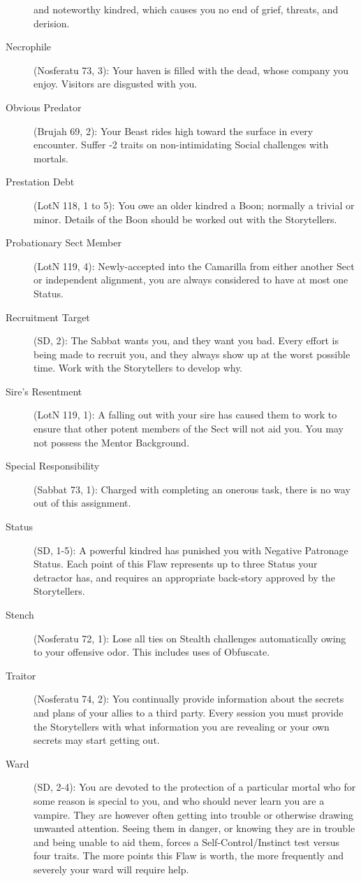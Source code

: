 \begin{description}
	and noteworthy kindred, which causes you no end of grief, threats, and derision.
	\item[Necrophile] (Nosferatu 73, 3):  Your haven is filled with the dead, whose company you 
	enjoy.  Visitors are disgusted with you.
	\item[Obvious Predator] (Brujah 69, 2):  Your Beast rides high toward the surface in every 
	encounter.  Suffer -2 traits on non-intimidating Social challenges with mortals.
	\item[Prestation Debt] (LotN 118, 1 to 5):  You owe an older kindred a Boon; normally a trivial or 
	minor.  Details of the Boon should be worked out with the Storytellers.
	\item[Probationary Sect Member] (LotN 119, 4):  Newly-accepted into the Camarilla from either 
	another Sect or independent alignment, you are always considered to have at most one Status.
	\item[Recruitment Target] (SD, 2):  The Sabbat wants you, and they want you bad.  Every effort 
	is being made to recruit you, and they always show up at the worst possible time.  Work with the 
	Storytellers to develop why.
	\item[Sire's Resentment] (LotN 119, 1):  A falling out with your sire has caused them to 
	work to ensure that other potent members of the Sect will not aid you.  You may not possess 
	the Mentor Background.
	\item[Special Responsibility] (Sabbat 73, 1):  Charged with completing an onerous task, there 
	is no way out of this assignment.
	\item[Status] (SD, 1-5):  A powerful kindred has punished you with Negative Patronage Status.  
	Each point of this Flaw represents up to three Status your detractor has, and requires an 
	appropriate back-story approved by the Storytellers.
	\item[Stench] (Nosferatu 72, 1):  Lose all ties on Stealth challenges automatically owing to 
	your offensive odor.  This includes uses of Obfuscate.
	\item[Traitor] (Nosferatu 74, 2):  You continually provide information about the secrets and 
	plans of your allies to a third party.  Every session you must provide the Storytellers with 
	what information you are revealing or your own secrets may start getting out.
	\item[Ward] (SD, 2-4):  You are devoted to the protection of a particular mortal 
	who for some reason is special to you, and who should never learn you are a vampire.  They are 
	however often getting into trouble or otherwise drawing unwanted attention.  Seeing them in 
	danger, or knowing they are in trouble and being unable to aid them, forces a 
	Self-Control/Instinct test versus four traits.  The more points this Flaw is worth, the more 
	frequently and severely your ward will require help.
\end{description}

